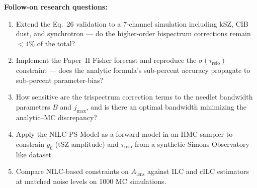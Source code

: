 \noindent\textbf{Follow-on research questions:}
\begin{enumerate}[leftmargin=1.6em,itemsep=0.2em,topsep=0.2em,label=Q\arabic*.]
\item Extend the Eq.~26 validation to a 7-channel simulation including kSZ, CIB dust, and synchrotron --- do the higher-order bispectrum corrections remain $<1\%$ of the total?
\item Implement the Paper~II Fisher forecast and reproduce the $\sigma(\tau_\mathrm{reio})$ constraint --- does the analytic formula's sub-percent accuracy propagate to sub-percent parameter-bias?
\item How sensitive are the trispectrum correction terms to the needlet bandwidth parameters $B$ and $j_\mathrm{max}$, and is there an optimal bandwidth minimizing the analytic--MC discrepancy?
\item Apply the NILC-PS-Model as a forward model in an HMC sampler to constrain $y_0$ (tSZ amplitude) and $\tau_\mathrm{reio}$ from a synthetic Simons Observatory-like dataset.
\item Compare NILC-based constraints on $A_\mathrm{lens}$ against ILC and cILC estimators at matched noise levels on 1000 MC simulations.
\end{enumerate}

